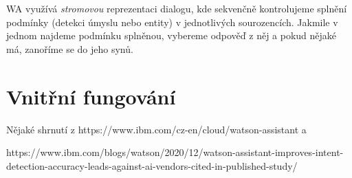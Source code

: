 WA využívá \textit{stromovou} reprezentaci dialogu,
kde sekvenčně kontrolujeme splnění podmínky (detekci úmyslu nebo entity) v
jednotlivých sourozencích. Jakmile v jednom najdeme podmínku splněnou, vybereme
odpověď z něj a pokud nějaké má, zanoříme se do jeho synů.

\section{Vnitřní fungování}\label{wa-inside}

Nějaké shrnutí z https://www.ibm.com/cz-en/cloud/watson-assistant a

https://www.ibm.com/blogs/watson/2020/12/watson-assistant-improves-intent-detection-accuracy-leads-against-ai-vendors-cited-in-published-study/